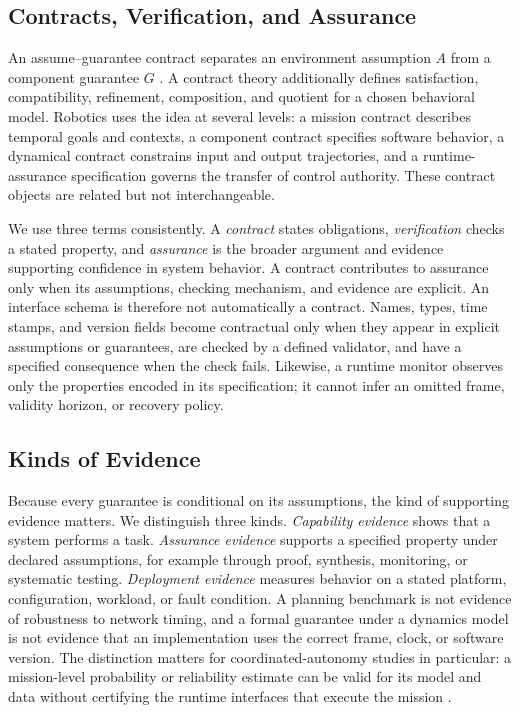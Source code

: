 \subsection{Contracts, Verification, and Assurance}

An assume--guarantee contract separates an environment assumption $A$ from a
component guarantee $G$ \cite{benveniste2007contracts}.  A contract theory
additionally defines satisfaction, compatibility, refinement, composition, and
quotient for a chosen behavioral model.  Robotics uses the idea at several
levels: a mission contract describes temporal goals and contexts, a component
contract specifies software behavior, a dynamical contract constrains input and
output trajectories, and a runtime-assurance specification governs the transfer
of control authority.  These contract objects are related but not
interchangeable.

We use three terms consistently.  A \emph{contract} states obligations,
\emph{verification} checks a stated property, and \emph{assurance} is the
broader argument and evidence supporting confidence in system behavior.  A
contract contributes to assurance only when its assumptions, checking mechanism,
and evidence are explicit.  An interface schema is therefore not automatically
a contract.  Names, types, time stamps, and version fields become contractual
only when they appear in explicit assumptions or guarantees, are checked by a
defined validator, and have a specified consequence when the check fails.
Likewise, a runtime monitor observes only the properties encoded in its
specification; it cannot infer an omitted frame, validity horizon, or recovery
policy.

\subsection{Kinds of Evidence}
\label{sec:evidence-kinds}

Because every guarantee is conditional on its assumptions, the kind of
supporting evidence matters.  We distinguish three kinds.  \emph{Capability
evidence} shows that a system performs a task.  \emph{Assurance evidence}
supports a specified property under declared assumptions, for example through
proof, synthesis, monitoring, or systematic testing.  \emph{Deployment evidence}
measures behavior on a stated platform, configuration, workload, or fault
condition.  A planning benchmark is not evidence of robustness to network
timing, and a formal guarantee under a dynamics model is not evidence that an
implementation uses the correct frame, clock, or software version.  The
distinction matters for coordinated-autonomy studies in particular: a
mission-level probability or reliability estimate can be valid for its model and
data without certifying the runtime interfaces that execute the mission
\cite{chaki2013probabilistic,porter2013reliability}.

